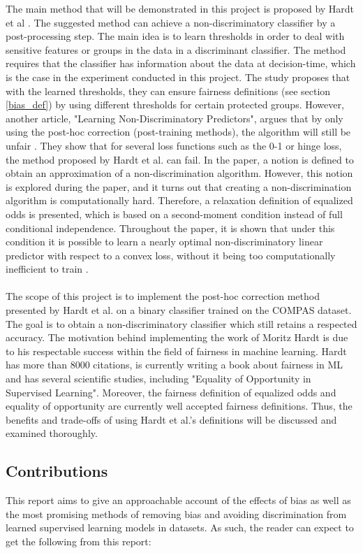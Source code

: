 \documentclass[11pt, fleqn, titlepage]{article}
\begin{document}
	\noindent The main method that will be demonstrated in this project is proposed by Hardt et al \cite{equal_of_oppor}. The suggested method can achieve a non-discriminatory classifier by a post-processing step. The main idea is to learn thresholds in order to deal with sensitive features or groups in the data in a discriminant classifier. The method requires that the classifier has information about the data at decision-time, which is the case in the experiment conducted in this project. The study proposes that with the learned thresholds, they can ensure fairness definitions (see section \ref{bias_def}) by using different thresholds for certain protected groups. However, another article, "Learning Non-Discriminatory Predictors", argues that by only using the post-hoc correction (post-training methods), the algorithm will still be unfair \cite{b_woodworth}. They show that for several loss functions such as the 0-1 or hinge loss, the method proposed by Hardt et al. \cite{equal_of_oppor} can fail. In the paper, a notion is defined to obtain an approximation of a non-discrimination algorithm. However, this notion is explored during the paper, and it turns out that creating a non-discrimination algorithm is computationally hard. Therefore, a relaxation definition of equalized odds is presented, which is based on a second-moment condition instead of full conditional independence. Throughout the paper, it is shown that under this condition it is possible to learn a nearly optimal non-discriminatory linear predictor with respect to a convex loss, without it being too computationally inefficient to train \cite{b_woodworth}.\\\\
	The scope of this project is to implement the post-hoc correction method presented by Hardt et al. on a binary classifier trained on the COMPAS dataset. The goal is to obtain a non-discriminatory classifier which still retains a respected accuracy. The motivation behind implementing the work of Moritz Hardt is due to his respectable success within the field of fairness in machine learning. Hardt has more than 8000 citations, is currently writing a book about fairness in ML and has several scientific studies, including "Equality of Opportunity in Supervised Learning". Moreover, the fairness definition of equalized odds and equality of opportunity are currently well accepted fairness definitions. Thus, the benefits and trade-offs of using Hardt et al.'s definitions will be discussed and examined thoroughly.
	
	\subsection{Contributions}
	This report aims to give an approachable account of the effects of bias as well as the most promising methods of removing bias and avoiding discrimination from learned supervised learning models in datasets. As such, the reader can expect to get the following from this report:
	
\end{document}

